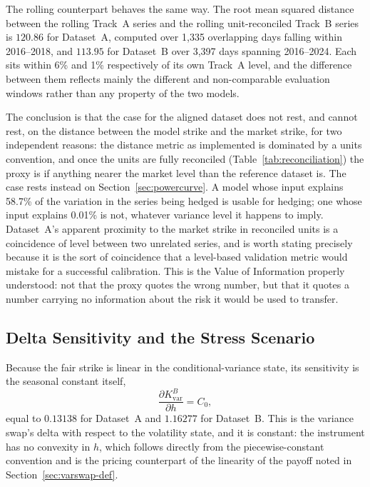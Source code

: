 \documentclass[11pt, a4paper, twoside]{article}
\begin{document}
The rolling counterpart behaves the same way. The root mean squared distance between the rolling Track~A series and the rolling unit-reconciled Track~B series is $120.86$ for Dataset~A, computed over 1{,}335 overlapping days falling within 2016--2018, and $113.95$ for Dataset~B over 3{,}397 days spanning 2016--2024. Each sits within 6\% and 1\% respectively of its own Track~A level, and the difference between them reflects mainly the different and non-comparable evaluation windows rather than any property of the two models.

The conclusion is that the case for the aligned dataset does not rest, and cannot rest, on the distance between the model strike and the market strike, for two independent reasons: the distance metric as implemented is dominated by a units convention, and once the units are fully reconciled (Table~\ref{tab:reconciliation}) the proxy is if anything nearer the market level than the reference dataset is. The case rests instead on Section~\ref{sec:powercurve}. A model whose input explains 58.7\% of the variation in the series being hedged is usable for hedging; one whose input explains 0.01\% is not, whatever variance level it happens to imply. Dataset~A's apparent proximity to the market strike in reconciled units is a coincidence of level between two unrelated series, and is worth stating precisely because it is the sort of coincidence that a level-based validation metric would mistake for a successful calibration. This is the Value of Information properly understood: not that the proxy quotes the wrong number, but that it quotes a number carrying no information about the risk it would be used to transfer.

\subsection{Delta Sensitivity and the Stress Scenario}
\label{sec:delta}

Because the fair strike is linear in the conditional-variance state, its sensitivity is the seasonal constant itself,
\begin{equation}
\frac{\partial K_{\text{var}}^B}{\partial h} = C_0,
\end{equation}
equal to $0.13138$ for Dataset~A and $1.16277$ for Dataset~B. This is the variance swap's delta with respect to the volatility state, and it is constant: the instrument has no convexity in $h$, which follows directly from the piecewise-constant convention and is the pricing counterpart of the linearity of the payoff noted in Section~\ref{sec:varswap-def}.
\end{document}
